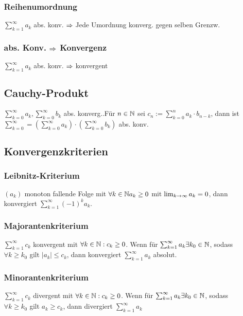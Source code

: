 \subsubsection*{Reihenumordnung}
$\sum_{k = 1}^\infty a_k$ abs. konv. $\Rightarrow$ Jede Umordnung konverg. gegen selben Grenzw.
\subsubsection*{abs. Konv. \texorpdfstring{$\Rightarrow$}{folgt} Konvergenz}
$\sum_{k = 1}^\infty a_k$ abs. konv. $\Rightarrow$ konvergent
\subsection*{Cauchy-Produkt}
$\sum_{k = 0}^\infty a_k, \sum_{k = 0}^\infty b_k$ abs. konverg..Für $n \in \mathbb N$ sei $c_n := \sum_{k = 0}^n a_k \cdot b_{n - k}$, dann ist $\sum_{k = 0}^\infty = \left(\sum_{k = 0}^\infty a_k\right) \cdot \left(\sum_{k = 0}^\infty b_k\right)$ abs. konv.
\subsection*{Konvergenzkriterien}

\subsubsection*{Leibnitz-Kriterium}
$(a_k)$ monoton fallende Folge mit $\forall k \in \mathbb N a_k \geq 0$ mit $\lim_{k \rightarrow \infty}a_k = 0$, dann konvergiert $\sum_{k = 1}^\infty (-1)^k a_k$.
\subsubsection*{Majorantenkriterium}
$\sum_{k = 1}^\infty c_k$ konvergent mit $\forall k \in \mathbb N: c_k \geq 0$. Wenn für $\sum_{k = 1}^\infty a_k \exists k_0 \in \mathbb N$, sodass $\forall k \geq k_0$ gilt $|a_k| \leq c_k$, dann konvergiert $\sum_{k = 1}^\infty a_k$ absolut.
\subsubsection*{Minorantenkriterium}
$\sum_{k = 1}^\infty c_k$ divergent mit $\forall k \in \mathbb N: c_k \geq 0$. Wenn für $\sum_{k = 1}^\infty a_k \exists k_0 \in \mathbb N$, sodass $\forall k \geq k_0$  gilt $a_k \geq c_k$, dann divergiert $\sum_{k = 1}^\infty a_k$
